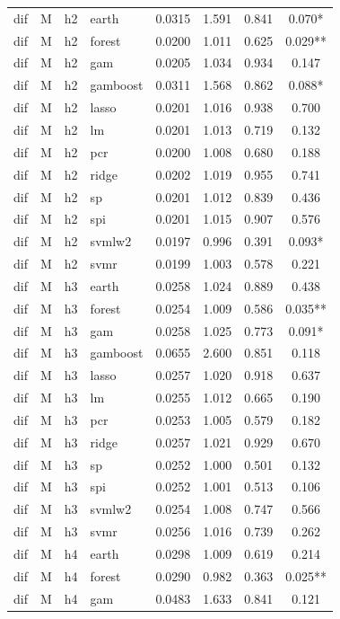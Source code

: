 \begin{ThreePartTable}
\begin{longtable}[t]{llclcccc}
\addlinespace
dif & M & h2 & earth & 0.0315 & 1.591 & 0.841 & 0.070*\\
dif & M & h2 & forest & 0.0200 & 1.011 & 0.625 & 0.029**\\
dif & M & h2 & gam & 0.0205 & 1.034 & 0.934 & 0.147\\
dif & M & h2 & gamboost & 0.0311 & 1.568 & 0.862 & 0.088*\\
dif & M & h2 & lasso & 0.0201 & 1.016 & 0.938 & 0.700\\
dif & M & h2 & lm & 0.0201 & 1.013 & 0.719 & 0.132\\
dif & M & h2 & pcr & 0.0200 & 1.008 & 0.680 & 0.188\\
dif & M & h2 & ridge & 0.0202 & 1.019 & 0.955 & 0.741\\
dif & M & h2 & sp & 0.0201 & 1.012 & 0.839 & 0.436\\
dif & M & h2 & spi & 0.0201 & 1.015 & 0.907 & 0.576\\
dif & M & h2 & svmlw2 & 0.0197 & 0.996 & 0.391 & 0.093*\\
dif & M & h2 & svmr & 0.0199 & 1.003 & 0.578 & 0.221\\
\addlinespace
dif & M & h3 & earth & 0.0258 & 1.024 & 0.889 & 0.438\\
dif & M & h3 & forest & 0.0254 & 1.009 & 0.586 & 0.035**\\
dif & M & h3 & gam & 0.0258 & 1.025 & 0.773 & 0.091*\\
dif & M & h3 & gamboost & 0.0655 & 2.600 & 0.851 & 0.118\\
dif & M & h3 & lasso & 0.0257 & 1.020 & 0.918 & 0.637\\
dif & M & h3 & lm & 0.0255 & 1.012 & 0.665 & 0.190\\
dif & M & h3 & pcr & 0.0253 & 1.005 & 0.579 & 0.182\\
dif & M & h3 & ridge & 0.0257 & 1.021 & 0.929 & 0.670\\
dif & M & h3 & sp & 0.0252 & 1.000 & 0.501 & 0.132\\
dif & M & h3 & spi & 0.0252 & 1.001 & 0.513 & 0.106\\
dif & M & h3 & svmlw2 & 0.0254 & 1.008 & 0.747 & 0.566\\
dif & M & h3 & svmr & 0.0256 & 1.016 & 0.739 & 0.262\\
\addlinespace
dif & M & h4 & earth & 0.0298 & 1.009 & 0.619 & 0.214\\
dif & M & h4 & forest & 0.0290 & 0.982 & 0.363 & 0.025**\\
dif & M & h4 & gam & 0.0483 & 1.633 & 0.841 & 0.121\\

\end{longtable}
\end{ThreePartTable}
